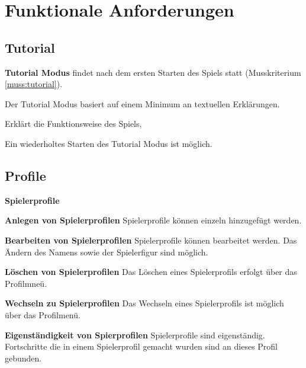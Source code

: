 \documentclass{scrartcl}
\begin{document}
\clearpage









\section{Funktionale Anforderungen}


\subsection{Tutorial} %
\label{sub:fa:tutorial}


\begin{falist}
	\item \label{fa:tutorial} \textbf{Tutorial Modus} findet nach dem ersten Starten des Spiels statt (Musskriterium \ref{muss:tutorial}).
	\begin{falist} 
        \item \label{fa:tutorial_01}Der Tutorial Modus basiert auf einem Minimum an textuellen Erklärungen.
        \item \label{fa:tutorial_02}Erklärt die Funktionsweise des Spiels,
		\item \label{fa:tutorial_03}Ein wiederholtes Starten des Tutorial Modus ist möglich.
	\end{falist}
\end{falist}

\subsection{Profile}
\begin{falist}[resume]
	\item \label{fa:spielerprofile} \textbf{Spielerprofile}
	\begin{falist}
		\item \label{fa:spielerprofile_anlegen} \textbf{Anlegen von Spielerprofilen} Spielerprofile können einzeln hinzugefügt werden.
		\item \label{fa:spielerprofile_bearbeiten} \textbf{Bearbeiten von Spielerprofilen} Spielerprofile können bearbeitet werden. Das Ändern des Namens sowie der Spielerfigur sind möglich.
		\item \label{fa:spielerprofile_loeschen} \textbf{Löschen von Spielerprofilen} Das Löschen eines Spielerprofils erfolgt über das Profilmneü.
		\item \label{fa:spielerprofile_wechseln} \textbf{Wechseln zu Spielerprofilen} Das Wechseln eines Spielerprofils ist möglich über das Profilmenü.
		\item \label{fa:spielerprofile_separiert} \textbf{Eigenständigkeit von Spierprofilen} Spielerprofile sind eigenständig. Fortschritte die in einem Spielerprofil gemacht wurden sind an dieses Profil gebunden.
	\end{falist}
\end{falist}
\end{document}
